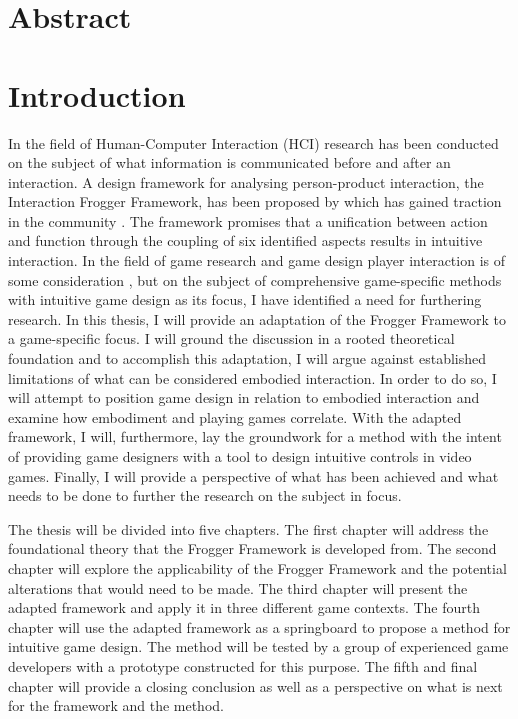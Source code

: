 \section*{Abstract}


\section*{Introduction}
In the field of Human-Computer Interaction (HCI) research has been conducted on the subject of what information is communicated before and after an interaction. A design framework for analysing person-product interaction, the Interaction Frogger Framework, has been proposed by  which has gained traction in the community \cite{transbehav, tangifrog, vermeulen, rthroughd, move, easy}. The framework promises that a unification between action and function through the coupling of six identified aspects results in intuitive interaction. In the field of game research and game design player interaction is of some consideration \cite{salen, fullerton, schell, adams, agustin}, but on the subject of comprehensive game-specific methods with intuitive game design as its focus, I have identified a need for furthering research. In this thesis, I will provide an adaptation of the Frogger Framework to a game-specific focus. I will ground the discussion in a rooted theoretical foundation and to accomplish this adaptation, I will argue against established limitations \cite{dourish} of what can be considered embodied interaction. In order to do so, I will attempt to position game design in relation to embodied interaction and examine how embodiment and playing games correlate. With the adapted framework, I will, furthermore, lay the groundwork for a method with the intent of providing game designers with a tool to design intuitive controls in video games. Finally, I will provide a perspective of what has been achieved and what needs to be done to further the research on the subject in focus.

The thesis will be divided into five chapters. The first chapter will address the foundational theory that the Frogger Framework is developed from. The second chapter will explore the applicability of the Frogger Framework and the potential alterations that would need to be made. The third chapter will present the adapted framework and apply it in three different game contexts. The fourth chapter will use the adapted framework as a springboard to propose a method for intuitive game design. The method will be tested by a group of experienced game developers with a prototype constructed for this purpose. The fifth and final chapter will provide a closing conclusion as well as a perspective on what is next for the framework and the method.

